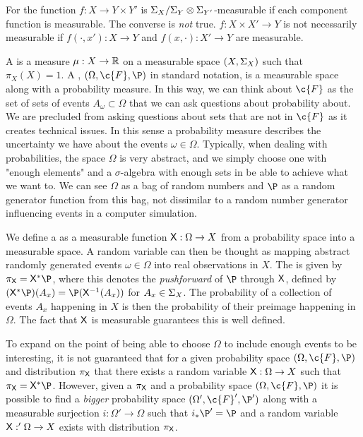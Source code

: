 For  the function \(f: X\to Y\times Y'\) is \(\Sigma_{X}/\Sigma_{Y}\otimes\Sigma_{Y'}\)-measurable if each component function is measurable. The converse is \emph{not} true.  \(f: X\times X'\to Y\) is not necessarily measurable if \(f(\cdot, x'): X\to Y\) and \(f(x, \cdot): X'\to Y\) are measurable.

A  is a measure \(\mu: X\to \mathbb{R}\) on a measurable space \((X, \Sigma_{X})\) such that \(\pi_X(X) = 1\).
A , \((\Omega, \c{F}, \P)\) in standard notation, is a measurable space along with a probability measure.
In this way, we can think about \(\c{F}\) as the set of sets of events \(A_\omega \subset \Omega\) that we can ask questions about probability about.
We are precluded from asking questions about sets that are not in \(\c{F}\) as it creates technical issues.
In this sense a probability measure describes the uncertainty we have about the events \(\omega \in \Omega\).
Typically, when dealing with probabilities, the space \(\Omega\) is very abstract, and we simply choose one with "enough elements" and a \(\sigma\)-algebra with enough sets in be able to achieve what we want to. 
We can see \(\Omega\) as a bag of random numbers and \(\P\) as a random generator function from this bag, not dissimilar to a random number generator influencing events in a computer simulation.

We define a  as a measurable function \(\mathsf{X}: \Omega \to X\) from a probability space into a measurable space. 
A random variable can then be thought as mapping abstract randomly generated events \(\omega \in \Omega\) into real observations in \(X\).
The  is given by \(\pi_\up{X} = \up{X}^*\P\), where this denotes the \emph{pushforward} of \(\P\) through \(\mathsf{X}\), defined by \((\up{X}^*\P)(A_x) = \P(\up{X}^{-1}(A_x))\) for \(A_x\in \Sigma_{X}\).
The probability of a collection of events \(A_x\) happening in \(X\) is then the probability of their preimage happening in \(\Omega\).
The fact that \(\mathsf{X}\) is measurable guarantees this is well defined.

To expand on the point of being able to choose \(\Omega\) to include enough events to be interesting, it is not guaranteed that for a given probability space \((\Omega, \c{F}, \P)\) and distribution \(\pi_{\mathsf{X}}\) that there exists a random variable \(\mathsf{X}: \Omega \to X\) such that \(\pi_\up{X} = \up{X}^*\P\). 
However, given a \(\pi_{\mathsf{X}}\) and a probability space \((\Omega, \c{F}, \P)\) it is possible to find a \emph{bigger} probability space \((\Omega', \c{F}', \P')\) along with a measurable surjection \(i: \Omega' \to \Omega\) such that \(i_* \P' = \P\) and a random variable \(\mathsf{X}: '\Omega \to X\) exists with distribution \(\pi_{\mathsf{X}}\).


